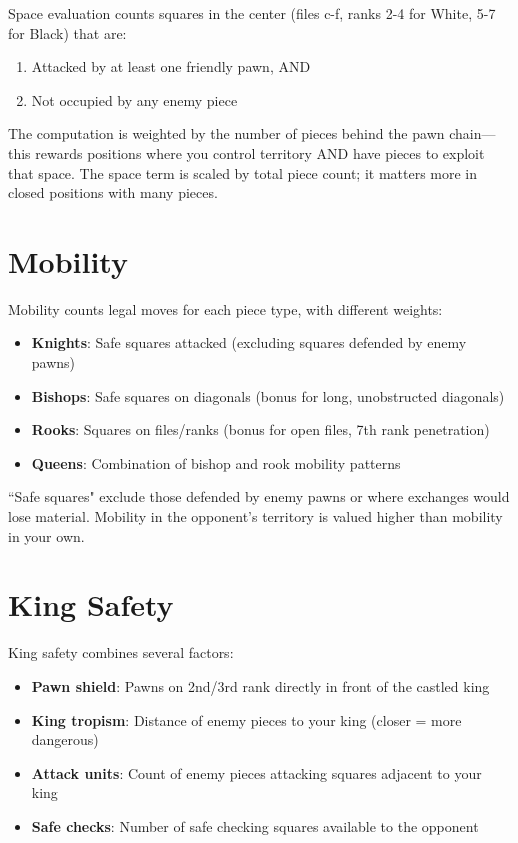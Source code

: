 \documentclass[11pt]{book}
\begin{document}
Space evaluation counts squares in the center (files c-f, ranks 2-4 for White, 5-7 for Black) that are:
\begin{enumerate}
\item Attacked by at least one friendly pawn, AND
\item Not occupied by any enemy piece
\end{enumerate}

The computation is weighted by the number of pieces behind the pawn chain---this rewards positions where you control territory AND have pieces to exploit that space. The space term is scaled by total piece count; it matters more in closed positions with many pieces.

\section{Mobility}

Mobility counts legal moves for each piece type, with different weights:
\begin{itemize}
\item \textbf{Knights}: Safe squares attacked (excluding squares defended by enemy pawns)
\item \textbf{Bishops}: Safe squares on diagonals (bonus for long, unobstructed diagonals)
\item \textbf{Rooks}: Squares on files/ranks (bonus for open files, 7th rank penetration)
\item \textbf{Queens}: Combination of bishop and rook mobility patterns
\end{itemize}

``Safe squares" exclude those defended by enemy pawns or where exchanges would lose material. Mobility in the opponent's territory is valued higher than mobility in your own.

\section{King Safety}

King safety combines several factors:
\begin{itemize}
\item \textbf{Pawn shield}: Pawns on 2nd/3rd rank directly in front of the castled king
\item \textbf{King tropism}: Distance of enemy pieces to your king (closer = more dangerous)
\item \textbf{Attack units}: Count of enemy pieces attacking squares adjacent to your king
\item \textbf{Safe checks}: Number of safe checking squares available to the opponent
\end{itemize}
\end{document}
